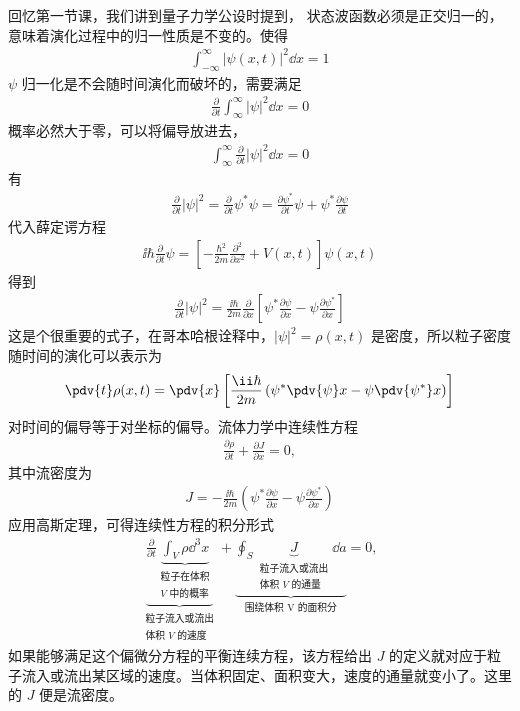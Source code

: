 回忆第一节课，我们讲到量子力学公设时提到，
状态波函数必须是正交归一的，意味着演化过程中的归一性质是不变的。使得
\begin{eqnarray}
    \int_{-\infty}^\infty |\psi(x,t)|^2 \dd x = 1
\end{eqnarray}
$\psi$ 归一化是不会随时间演化而破坏的，需要满足
\begin{eqnarray}
    \frac{\partial}{\partial t} \int_{\infty}^\infty |\psi|^2 \dd x = 0
\end{eqnarray}
概率必然大于零，可以将偏导放进去，
\begin{eqnarray}
    \int_{\infty}^\infty \frac{\partial}{\partial t}  |\psi|^2 \dd x = 0
\end{eqnarray}
有
\begin{eqnarray}
    \frac{\partial}{\partial t} |\psi|^2 = \frac{\partial}{\partial t} \psi^* \psi = \frac{\partial \psi^*}{\partial t}\psi + \psi^* \frac{\partial \psi}{\partial t}
\end{eqnarray}
代入薛定谔方程
\begin{eqnarray}
    \ii\hbar \frac{\partial}{\partial t} \psi = \left[
        -\frac{\hbar^2}{2m} \frac{\partial^2}{\partial x^2} + V(x,t)
    \right]
    \psi(x,t)
\end{eqnarray}
得到
\begin{eqnarray}
    \frac{\partial}{\partial t} |\psi|^2 = \frac{\ii\hbar}{2m} \frac{\partial}{\partial x}
    \left[
        \psi^* \frac{\partial \psi}{\partial x} - \psi \frac{\partial \psi^*}{\partial x}
    \right]
\end{eqnarray}
这是个很重要的式子，在哥本哈根诠释中，$|\psi|^2 = \rho(x,t)$ 是密度，所以粒子密度随时间的演化可以表示为
\begin{eqnarray}
    \pdv{t} \rho(x,t) = \pdv{x} \left[
        \frac{\ii\hbar}{2m} \left(
            \psi^* \pdv{\psi}x - \psi\pdv{\psi^*}x
        \right)
    \right]
\end{eqnarray}
对时间的偏导等于对坐标的偏导。流体力学中连续性方程
\begin{eqnarray}
    \frac{\partial \rho}{\partial t} + \frac{\partial J}{\partial x} = 0, 
\end{eqnarray}
其中流密度为
\begin{eqnarray}
    J = -\frac{\ii\hbar}{2m} \left( \psi^* \frac{\partial \psi}{\partial x} - \psi \frac{\partial \psi^*}{\partial x}\right)
\end{eqnarray}
应用高斯定理，可得连续性方程的积分形式
\begin{eqnarray}
    \underbrace{\frac{\partial}{\partial t} \underbrace{\int_V \rho \dd^3x}_{\substack{\text{粒子在体积} \\ \text{$V$ 中的概率}}} }_{\substack{\text{粒子流入或流出}\\ \text{体积 $V$ 的速度}}} 
     + 
    \underbrace{\oint_S \underbrace{J}_{\substack{\text{粒子流入或流出}\\ \text{体积 $V$ 的通量}}} \dd a}_{\text{围绕体积 V 的面积分}} = 0,
\end{eqnarray}
如果能够满足这个偏微分方程的平衡连续方程，该方程给出 $J$ 的定义就对应于粒子流入或流出某区域的速度。当体积固定、面积变大，速度的通量就变小了。这里的 $J$ 便是流密度。

